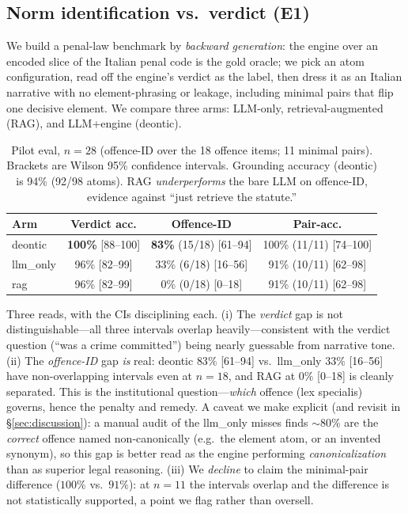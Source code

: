 \documentclass[11pt]{article}
\begin{document}
\subsection{Norm identification vs.\ verdict (E1)}
We build a penal-law benchmark by \emph{backward generation}: the engine over an
encoded slice of the Italian penal code is the gold oracle; we pick an atom
configuration, read off the engine's verdict as the label, then dress it as an
Italian narrative with no element-phrasing or leakage, including minimal pairs that
flip one decisive element. We compare three arms: LLM-only, retrieval-augmented
(RAG), and LLM+engine (deontic).

\begin{table}[h]\centering
\begin{tabular}{lccc}
\toprule
Arm & Verdict acc. & Offence-ID & Pair-acc.\\
\midrule
deontic   & \textbf{100\%} [88--100] & \textbf{83\%} (15/18) [61--94] & 100\% (11/11) [74--100]\\
llm\_only  & 96\% [82--99]  & 33\% (6/18) [16--56]  & 91\% (10/11) [62--98]\\
rag       & 96\% [82--99]  & 0\% (0/18) [0--18]    & 91\% (10/11) [62--98]\\
\bottomrule
\end{tabular}
\caption{Pilot eval, $n{=}28$ (offence-ID over the 18 offence items; 11 minimal pairs).
Brackets are Wilson 95\% confidence intervals. Grounding accuracy (deontic) is 94\%
(92/98 atoms). RAG \emph{underperforms} the bare LLM on offence-ID, evidence against
``just retrieve the statute.''}
\label{tab:e1}
\end{table}

Three reads, with the CIs disciplining each. (i) The \emph{verdict} gap is not
distinguishable---all three intervals overlap heavily---consistent with the verdict
question (``was a crime committed'') being nearly guessable from narrative tone. (ii)
The \emph{offence-ID} gap \emph{is} real: deontic $83\%$ [61--94] vs.\ llm\_only $33\%$
[16--56] have non-overlapping intervals even at $n{=}18$, and RAG at $0\%$ [0--18] is
cleanly separated. This is the institutional question---\emph{which} offence (lex
specialis) governs, hence the penalty and remedy. A caveat we make explicit (and
revisit in \S\ref{sec:discussion}): a manual audit of the llm\_only misses finds
$\sim$80\% are the \emph{correct} offence named non-canonically (e.g.\ the element
atom, or an invented synonym), so this gap is better read as the engine performing
\emph{canonicalization} than as superior legal reasoning. (iii) We \emph{decline} to claim the
minimal-pair difference ($100\%$ vs.\ $91\%$): at $n{=}11$ the intervals overlap and the
difference is not statistically supported, a point we flag rather than oversell.
\end{document}

